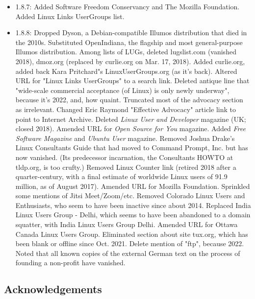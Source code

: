 \documentclass{HOWTO}
\begin{document}
\begin{itemize}
\item 1.8.7:  Added Software Freedom Conservancy and The Mozilla
Foundation.  Added Linux Links UserGroups list.
\item 1.8.8:  Dropped Dyson, a Debian-compatible Illumos
distribution that died in the 2010s.  Substituted OpenIndiana, the
flagship and most general-purpose Illumos distribution.  Among lists of
LUGs, deleted lugslist.com (vanished 2018), dmoz.org (replaced by
curlie.org on Mar. 17, 2018).  Added curlie.org, added back Kara Pritchard"s 
LinuxUserGroups.org (as it's back).  Altered URL for "Linux Links
UserGroups" to a search link.  Deleted antique line that "wide-scale commercial acceptance 
(of Linux) is only newly underway", because it's 2022, and, how quaint.  Truncated most 
of the advocacy section as irrelevant.  Changed Eric Raymond "Effective Advocacy" article 
link to point to Internet Archive.
Deleted {\itshape Linux User and Developer\/} magazine (UK; closed 2018). Amended URL for 
{\itshape Open Source for You\/} magazine.  Added {\itshape Free Software Magazine\/} and 
{\itshape Ubuntu User\/} magazine.  Removed 
Joshua Drake's Linux Consultants Guide that had moved to Command Prompt, Inc. but
has now vanished.  (Its predecessor incarnation, the Consultants HOWTO at tldp.org, 
is too crufty.)  Removed Linux Counter link (retired 2018 after a quarter-century, 
with a final estimate of worldwide Linux users of 91.9 million, as of August 2017).
Amended URL for Mozilla Foundation.  Sprinkled some mentions of Jitsi Meet/Zoom/etc.
Removed Colorado Linux Users and Enthusiasts, who seem to have been inactive since 
about 2014.  Replaced India Linux Users Group - Delhi, which seems to have been abandoned 
to a domain squatter, with India Linux Users Group Delhi.  Amended URL for Ottawa 
Canada Linux Users Group.  Eliminated section about site tux.org, which has been blank
or offline since Oct. 2021.  Delete mention of "ftp", because 2022.  Noted that 
all known copies of the external German text on the process of founding a non-profit have 
vanished.
\end{itemize}









\subsection{Acknowledgements}
\end{document}
